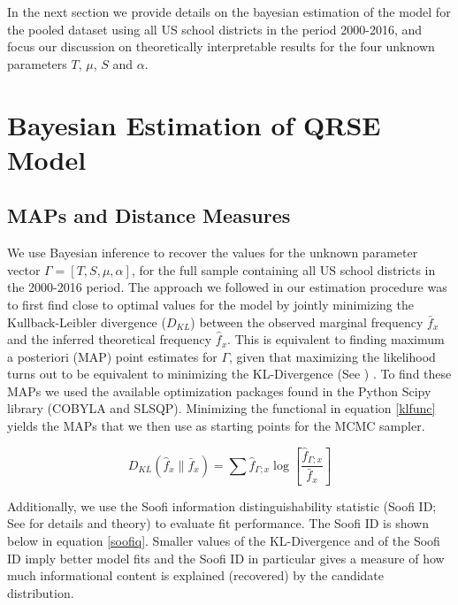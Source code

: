 \medskip 

In the next section we provide details on the bayesian estimation of
the model for the pooled dataset using all US school districts in the
period 2000-2016, and focus our discussion on theoretically
interpretable results for the four unknown parameters $T$, $\mu$, $S$
and $\alpha$.


\section{Bayesian Estimation of QRSE Model}
\label{sec-5}

\subsection{MAPs and Distance Measures}
\label{sec-5-1}

We use Bayesian inference to recover the values for the unknown
parameter vector $\Gamma = [T, S, \mu, \alpha]$, for the full sample
containing all US school districts in the 2000-2016 period. The
approach we followed in our estimation procedure was to first find
close to optimal values for the model by jointly minimizing the
Kullback-Leibler divergence ($D_{KL}$) between the observed marginal
frequency $\bar{f}_{x}$ and the inferred theoretical frequency
$\hat{f}_{x}$. This is equivalent to finding maximum a posteriori
(MAP) point estimates for $\Gamma$, given that maximizing the
likelihood turns out to be equivalent to minimizing the KL-Divergence
(See \citet{golan_foundations}) . To find these MAPs we used the
available optimization packages found in the Python Scipy library
(COBYLA and SLSQP). Minimizing the functional in equation \ref{klfunc}
yields the MAPs that we then use as starting points for the MCMC
sampler.

\medskip 

\begin{equation} \label{klfunc} D_{K L}\left(\hat{f}_{x} \|
\bar{f}_{x} \right)=\sum \hat{f}_{\Gamma;x} \log
\left[\frac{\hat{f}_{\Gamma;x}}{\bar{f}_{x}}\right] \end{equation}

\medskip 

Additionally, we use the Soofi information distinguishability
statistic (Soofi ID; See \citet{soofi_information_2002} for details and
theory) to evaluate fit performance. The Soofi ID is shown below in
equation \ref{soofiq}. Smaller values of the KL-Divergence and of the
Soofi ID imply better model fits and the Soofi ID in particular gives
a measure of how much informational content is explained (recovered)
by the candidate distribution.


